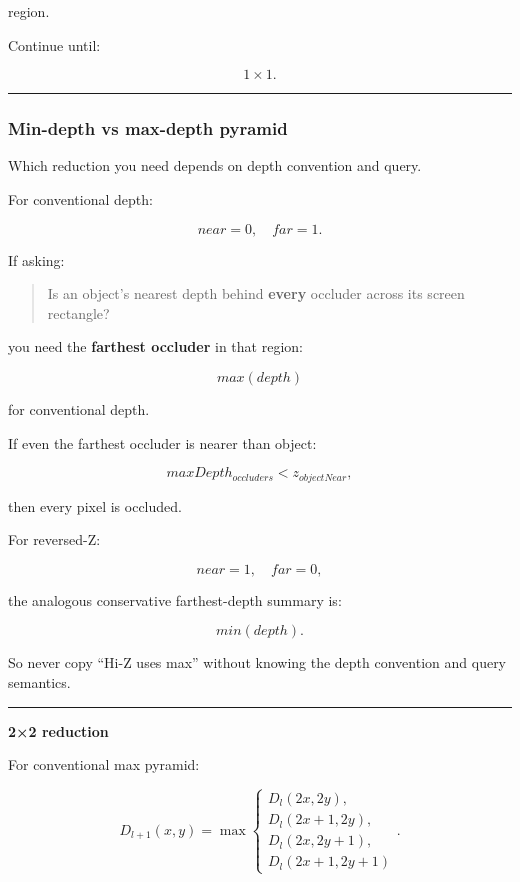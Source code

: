 region.

Continue until:

\[
1\times1.
\]

\begin{center}\rule{0.5\linewidth}{0.5pt}\end{center}

\subsubsection{Min-depth vs max-depth pyramid}\label{min-depth-vs-max-depth-pyramid}

Which reduction you need depends on depth convention and query.

For conventional depth:

\[
near=0,\quad far=1.
\]

If asking:

\begin{quote}
Is an object's nearest depth behind \textbf{every} occluder across its screen rectangle?
\end{quote}

you need the \textbf{farthest occluder} in that region:

\[
\boxed{
max(depth)
}
\]

for conventional depth.

If even the farthest occluder is nearer than object:

\[
maxDepth_{occluders}
<
z_{objectNear},
\]

then every pixel is occluded.

For reversed-Z:

\[
near=1,\quad far=0,
\]

the analogous conservative farthest-depth summary is:

\[
\boxed{
min(depth).
}
\]

So never copy ``Hi-Z uses max'' without knowing the depth convention and query semantics.

\begin{center}\rule{0.5\linewidth}{0.5pt}\end{center}

\textbf{2×2 reduction}

For conventional max pyramid:

\[
D_{l+1}(x,y)
=
\max
\begin{cases}
D_l(2x,2y),\\
D_l(2x+1,2y),\\
D_l(2x,2y+1),\\
D_l(2x+1,2y+1)
\end{cases}.
\]

